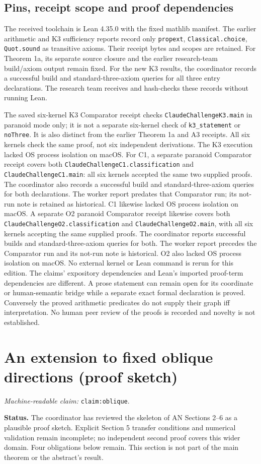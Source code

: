 \documentclass[11pt]{amsart}
\newcommand{\record}[1]{\nolinkurl{#1}}
\newcommand{\claimid}[1]{\par\nopagebreak\noindent\textit{Machine-readable claim:} \record{#1}.\par}
\theoremstyle{definition}\newtheorem{definition}{Definition}
\begin{document}
\subsection{Pins, receipt scope and proof dependencies}\label{sec:formal-records}
The received toolchain is Lean 4.35.0 with the fixed mathlib manifest.
The earlier arithmetic and K3 sufficiency reports record only
\record{propext}, \record{Classical.choice}, \record{Quot.sound} as
transitive axioms. Their receipt bytes and scopes are retained.
For Theorem 1a, its separate source closure and the earlier research-team
build/axiom output remain fixed. For the new K3 results, the coordinator
records a successful build and standard-three-axiom queries for all three
entry declarations. The research team receives and hash-checks these
records without running Lean.

The saved six-kernel K3 Comparator receipt checks
\record{ClaudeChallengeK3.main} in paranoid mode only; it is not a separate
six-kernel check of \record{k3_statement} or \record{noThree}.
It is also distinct from the earlier Theorem 1a and A3 receipts.
All six kernels check the same proof, not six independent derivations.
The K3 execution lacked OS process isolation on macOS. For C1, a separate
paranoid Comparator receipt covers both
\record{ClaudeChallengeC1.classification} and \record{ClaudeChallengeC1.main}:
all six kernels accepted the same two supplied proofs. The coordinator
also records a successful build and standard-three-axiom queries for
both declarations. The worker report predates that Comparator run;
its not-run note is retained as historical. C1 likewise lacked OS process
isolation on macOS. A separate O2 paranoid Comparator receipt likewise
covers both \record{ClaudeChallengeO2.classification} and
\record{ClaudeChallengeO2.main}, with all six kernels accepting the same
supplied proofs. The coordinator reports successful builds and
standard-three-axiom queries for both. The worker report precedes the
Comparator run and its not-run note is historical. O2 also lacked OS
process isolation on macOS. No external kernel or Lean command is rerun
for this edition.
The claims' expository dependencies and Lean's imported proof-term
dependencies are different. A prose statement can remain open for
its coordinate or human-semantic bridge while a separate exact
formal declaration is proved. Conversely the proved arithmetic
predicates do not supply their graph iff interpretation. No human
peer review of the proofs is recorded and novelty is not established.

\section{An extension to fixed oblique directions (proof sketch)}\label{sec:extension}
\label{claim:oblique}\claimid{claim:oblique}
\textbf{Status.} The coordinator has reviewed the skeleton of AN
Sections 2--6 as a plausible proof sketch. Explicit Section 5 transfer
conditions and numerical validation remain incomplete; no independent
second proof covers this wider domain. Four obligations below remain.
This section is not part of the main theorem or the abstract's result.
\end{document}
